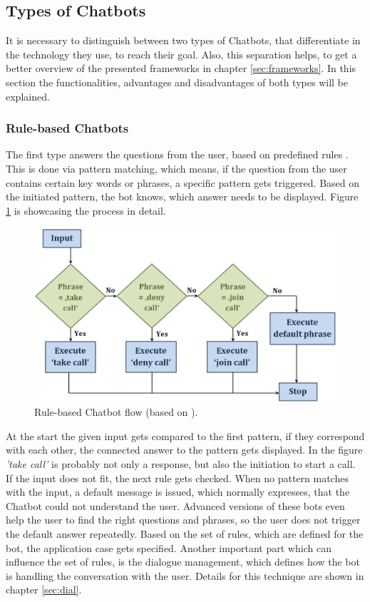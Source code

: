 \documentclass[10pt,final,journal,a4paper,oneside,twocolumn]{IEEEtran}
\begin{document}
\subsection{Types of Chatbots}\label{sec::types}
It is necessary to distinguish between two types of Chatbots, that differentiate in the technology they use, to reach their goal. Also, this separation helps, to get a better overview of the presented frameworks in chapter \ref{sec:frameworks}. In this section the functionalities, advantages and disadvantages of both types will be explained.
\\
\subsubsection{Rule-based Chatbots}
The first type answers the questions from the user, based on predefined rules \cite{b8}. This is done via pattern matching, which means, if the question from the user contains certain key words or phrases, a specific pattern gets triggered. Based on the initiated pattern, the bot knows, which answer needs to be displayed. Figure \ref{pattern} is showcasing the process in detail.
\begin{figure}[htbp]
	\centerline{\includegraphics[width=1\linewidth]{pictures/ruleflow.jpg}}
	\caption{Rule-based Chatbot flow (based on \cite{b8}).}
	\label{pattern}
\end{figure}
At the start the given input gets compared to the first pattern, if they correspond with each other, the connected answer to the pattern gets displayed. In the figure \textit{'take call'} is probably not only a response, but also the initiation to start a call. If the input does not fit, the next rule gets checked. When no pattern matches with the input, a default message is issued, which normally expresses, that the Chatbot could not understand the user. Advanced versions of these bots even help the user to find the right questions and phrases, so the user does not trigger the default answer repeatedly. Based on the set of rules, which are defined for the bot, the application case gets specified. Another important part which can influence the set of rules, is the dialogue management, which defines how the bot is handling the conversation with the user. Details for this technique are shown in chapter \ref{sec:dial}.\\
\end{document}
